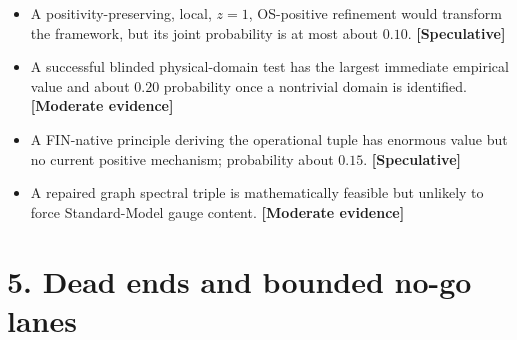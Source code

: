\documentclass[11pt,a4paper,openany]{report}
\newcommand{\statusModerate}{\textcolor{finviolet}{[Moderate evidence]}}
\newcommand{\statusSpeculative}{\textcolor{finorange}{[Speculative]}}
\begin{document}
\begin{itemize}
\item 
A positivity-preserving, local, \(z=1\), OS-positive refinement would transform the framework, but its joint probability is at most about \(0.10\). \textbf{\statusSpeculative{}}

\item 
A successful blinded physical-domain test has the largest immediate empirical value and about \(0.20\) probability once a nontrivial domain is identified. \textbf{\statusModerate{}}

\item 
A FIN-native principle deriving the operational tuple has enormous value but no current positive mechanism; probability about \(0.15\). \textbf{\statusSpeculative{}}

\item 
A repaired graph spectral triple is mathematically feasible but unlikely to force Standard-Model gauge content. \textbf{\statusModerate{}}

\end{itemize}

\section{5. Dead ends and bounded no-go lanes}
\end{document}
